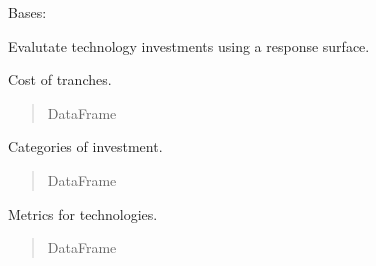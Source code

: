 \documentclass[letterpaper,10pt,english]{sphinxmanual}
\begin{document}
\begin{fulllineitems}
\label{\detokenize{tyche:tyche.Evaluator.Evaluator}}
\pysigstartsignatures
{}
\pysigstopsignatures
\sphinxAtStartPar
Bases: 

\sphinxAtStartPar
Evalutate technology investments using a response surface.

\begin{fulllineitems}
\label{\detokenize{tyche:tyche.Evaluator.Evaluator.amounts}}
\pysigstartsignatures
{}
\pysigstopsignatures
\sphinxAtStartPar
Cost of tranches.
\begin{quote}\begin{description}
\sphinxAtStartPar
DataFrame

\end{description}\end{quote}

\end{fulllineitems}


\begin{fulllineitems}
\label{\detokenize{tyche:tyche.Evaluator.Evaluator.categories}}
\pysigstartsignatures
{}
\pysigstopsignatures
\sphinxAtStartPar
Categories of investment.
\begin{quote}\begin{description}
\sphinxAtStartPar
DataFrame

\end{description}\end{quote}

\end{fulllineitems}


\begin{fulllineitems}
\label{\detokenize{tyche:tyche.Evaluator.Evaluator.metrics}}
\pysigstartsignatures
{}
\pysigstopsignatures
\sphinxAtStartPar
Metrics for technologies.
\begin{quote}\begin{description}
\sphinxAtStartPar
DataFrame


\end{description}
\end{quote}
\end{fulllineitems}
\end{fulllineitems}
\end{document}
